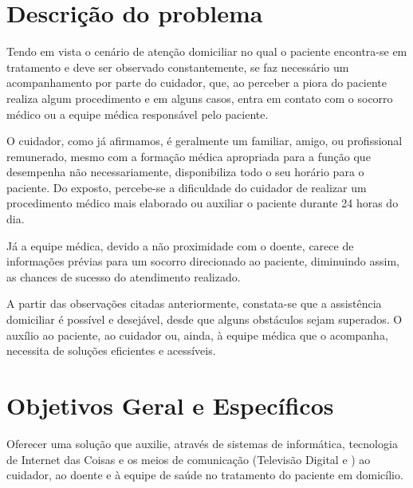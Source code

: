 \section{Descrição do problema}\label{sec:descricao-problema}

Tendo em vista o cenário de atenção domiciliar no qual o paciente
encontra-se em tratamento e deve ser observado constantemente, 
se faz necessário um acompanhamento por parte do cuidador, que, ao perceber 
a piora do paciente realiza algum procedimento e em alguns casos, entra 
em contato com o socorro médico ou a equipe médica responsável pelo paciente.

O cuidador, como já afirmamos, é geralmente um familiar, amigo, ou profissional
remunerado, mesmo com a formação médica apropriada para a função que desempenha não
necessariamente, disponibiliza todo o seu horário para o paciente. Do exposto,
percebe-se a dificuldade do cuidador de realizar um procedimento médico mais
elaborado ou auxiliar o paciente durante 24 horas do dia.

Já a equipe médica, devido a não proximidade com o doente, carece de informações
prévias para um socorro direcionado ao paciente, diminuindo assim, as chances de
sucesso do atendimento realizado.


A partir das observações citadas anteriormente, constata-se que a assistência
domiciliar é possível e desejável, desde que alguns obstáculos sejam superados.
O auxílio ao paciente, ao cuidador ou, ainda, à equipe médica que o
acompanha, necessita de soluções eficientes e acessíveis.

\section{Objetivos Geral e Específicos}\label{sec:objetivos}

Oferecer uma solução que auxilie, através de sistemas de informática, tecnologia
de Internet das Coisas e os meios de comunicação (Televisão Digital e 
\smartphones) ao cuidador, ao doente e à equipe de saúde no tratamento 
do paciente em domicílio.

